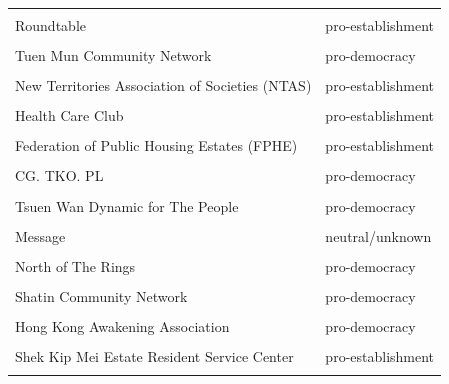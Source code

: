 \documentclass[letterpaper, 12pt]{article}
\begin{document}
\begin{appendices}
\begin{longtable}[c]{ll}
\cellcolor{gray!6}{Tsuen Wan Community Network} & \cellcolor{gray!6}{pro-democracy}\\
Roundtable & pro-establishment\\
\cellcolor{gray!6}{Neo Democrats} & \cellcolor{gray!6}{pro-democracy}\\
Tuen Mun Community Network & pro-democracy\\
\cellcolor{gray!6}{Civic Passion} & \cellcolor{gray!6}{pro-democracy}\\
New Territories Association of Societies (NTAS) & pro-establishment\\
\cellcolor{gray!6}{Neighbourhood \& Worker's Service Centre} & \cellcolor{gray!6}{pro-democracy}\\
Health Care Club & pro-establishment\\
\cellcolor{gray!6}{The Hong Kong Federation of Trade Unions*} & \cellcolor{gray!6}{pro-establishment}\\
Federation of Public Housing Estates (FPHE) & pro-establishment\\
\cellcolor{gray!6}{Civil Force} & \cellcolor{gray!6}{pro-establishment}\\
CG. TKO. PL & pro-democracy\\
\cellcolor{gray!6}{Youngspiration} & \cellcolor{gray!6}{pro-democracy}\\
Tsuen Wan Dynamic for The People & pro-democracy\\
\cellcolor{gray!6}{Tuen Mun Community Concern Group} & \cellcolor{gray!6}{neutral/unknown}\\
Message & neutral/unknown\\
\cellcolor{gray!6}{Tin Shui Wai New Force} & \cellcolor{gray!6}{pro-democracy}\\
North of The Rings & pro-democracy\\
\cellcolor{gray!6}{Neo  Democrats} & \cellcolor{gray!6}{pro-democracy}\\
Shatin Community Network & pro-democracy\\
\cellcolor{gray!6}{People for Power} & \cellcolor{gray!6}{pro-democracy}\\
Hong Kong Awakening Association & pro-democracy\\
\cellcolor{gray!6}{Sham Shui Po Residents Association} & \cellcolor{gray!6}{pro-establishment}\\
Shek Kip Mei Estate Resident Service Center & pro-establishment\\
\cellcolor{gray!6}{China Youth Service \& Recreation Centre} & \cellcolor{gray!6}{pro-establishment}\\

\end{longtable}
\end{appendices}
\end{document}
